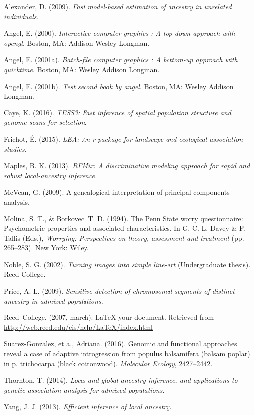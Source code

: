 \documentclass[12pt,twoside]{reedthesis}
\theoremstyle{definition}
\theoremstyle{definition}
\theoremstyle{remark}
\begin{document}
  \noindent
  
  \setlength{\parindent}{-0.20in} \setlength{\leftskip}{0.20in}
  \setlength{\parskip}{8pt}
  
  \hypertarget{refs}{}
  \hypertarget{ref-alexander2009}{}
  Alexander, D. (2009). \emph{Fast model-based estimation of ancestry in
  unrelated individuals.}
  
  \hypertarget{ref-angel2000}{}
  Angel, E. (2000). \emph{Interactive computer graphics : A top-down
  approach with opengl}. Boston, MA: Addison Wesley Longman.
  
  \hypertarget{ref-angel2001}{}
  Angel, E. (2001a). \emph{Batch-file computer graphics : A bottom-up
  approach with quicktime}. Boston, MA: Wesley Addison Longman.
  
  \hypertarget{ref-angel2002a}{}
  Angel, E. (2001b). \emph{Test second book by angel}. Boston, MA: Wesley
  Addison Longman.
  
  \hypertarget{ref-caye2016}{}
  Caye, K. (2016). \emph{TESS3: Fast inference of spatial population
  structure and genome scans for selection.}
  
  \hypertarget{ref-frichot2015}{}
  Frichot, É. (2015). \emph{LEA: An r package for landscape and ecological
  association studies.}
  
  \hypertarget{ref-maples2013}{}
  Maples, B. K. (2013). \emph{RFMix: A discriminative modeling approach
  for rapid and robust local-ancestry inference.}
  
  \hypertarget{ref-mcvean2009}{}
  McVean, G. (2009). A genealogical interpretation of principal components
  analysis.
  
  \hypertarget{ref-Molina1994}{}
  Molina, S. T., \& Borkovec, T. D. (1994). The Penn State worry
  questionnaire: Psychometric properties and associated characteristics.
  In G. C. L. Davey \& F. Tallis (Eds.), \emph{Worrying: Perspectives on
  theory, assessment and treatment} (pp. 265--283). New York: Wiley.
  
  \hypertarget{ref-noble2002}{}
  Noble, S. G. (2002). \emph{Turning images into simple line-art}
  (Undergraduate thesis). Reed College.
  
  \hypertarget{ref-price2009}{}
  Price, A. L. (2009). \emph{Sensitive detection of chromosomal segments
  of distinct ancestry in admixed populations.}
  
  \hypertarget{ref-reedweb2007}{}
  Reed~College. (2007, march). LaTeX your document. Retrieved from
  \url{http://web.reed.edu/cis/help/LaTeX/index.html}
  
  \hypertarget{ref-suarez2016}{}
  Suarez-Gonzalez, et a., Adriana. (2016). Genomic and functional
  approaches reveal a case of adaptive introgression from populus
  balsamifera (balsam poplar) in p. trichocarpa (black cottonwood).
  \emph{Molecular Ecology}, 2427--2442.
  
  \hypertarget{ref-thornton2014}{}
  Thornton, T. (2014). \emph{Local and global ancestry inference, and
  applications to genetic association analysis for admixed populations.}
  
  \hypertarget{ref-yang2013}{}
  Yang, J. J. (2013). \emph{Efficient inference of local ancestry.}


\end{document}
